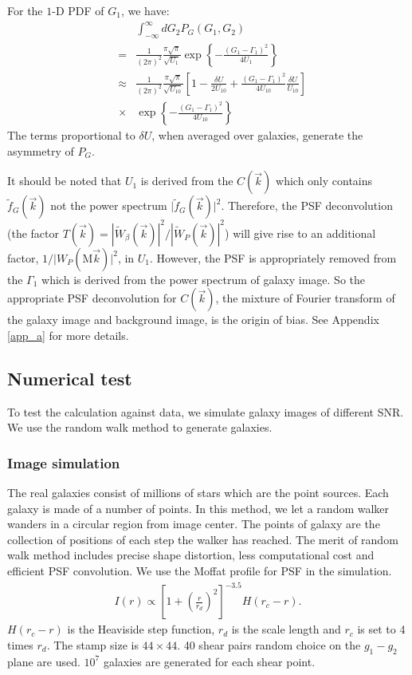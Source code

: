 \documentclass[twocolumn]{aastex62}
\begin{document}
For the $1$-D PDF of $G_1$, we have:
\begin{eqnarray}
\label{1d_PDF}
&&\int_{-\infty}^{\infty}dG_2 P_G\left(G_1,G_2\right)\\ \nonumber
&=&\frac{1}{(2\pi)^2}\frac{\pi\sqrt{\pi}}{\sqrt{U_1}}\exp\left\{-\frac{\left(G_1-\Gamma_1\right)^2}{4U_1}\right\}\\ \nonumber
&\approx&\frac{1}{(2\pi)^2}\frac{\pi\sqrt{\pi}}{\sqrt{U_{10}}}\left[1-\frac{\delta U}{2U_{10}}+\frac{\left(G_1-\Gamma_1\right)^2}{4U_{10}}\frac{\delta U}{U_{10}}\right] \\ \nonumber &\times&\exp\left\{-\frac{\left(G_1-\Gamma_1\right)^2}{4U_{10}}\right\}
\end{eqnarray}
The terms proportional to $\delta U$, when averaged over galaxies, generate the asymmetry of $P_G$. 

It should be noted that $U_1$ is derived from the $C(\vec{k})$ which only contains $\widetilde{f}_G(\vec{k})$ not the power spectrum $\vert\widetilde{f}_G(\vec{k})\vert^2$. Therefore, the PSF deconvolution (the factor $T(\vec{k}) = |\widetilde{W}_{\beta}(\vec{k})|^2/|\widetilde{W}_{P}(\vec{k})|^2$) will give rise to an additional factor, $1/\vert W_{P}(\mathrm{M}\vec{k})\vert^2$, in $U_1$. However, the PSF is appropriately removed from the $\Gamma_1$ which is derived from the power spectrum of galaxy image. So the appropriate PSF deconvolution for $C(\vec{k})$, the mixture of Fourier transform of the galaxy image and background image, is the origin of bias. See Appendix \ref{app_a} for more details.


\subsection{Numerical test}
To test the calculation against data, we simulate galaxy images of different SNR. We use the random walk method to generate galaxies.
\subsubsection{Image simulation}
The real galaxies consist of millions of stars which are the point sources. Each galaxy is made of a number of points. In this method, we let a random walker wanders in a circular region from image center. The points of galaxy are the collection of positions of each step the walker has reached. The merit of random walk method includes precise shape distortion, less computational cost and efficient PSF convolution. We use the Moffat profile for PSF in the simulation. 
\begin{eqnarray}
I(r) \propto \left[1+\left(\frac{r}{r_d}\right)^2\right]^{-3.5}H(r_c-r).
\end{eqnarray}
$H(r_c-r)$ is the Heaviside step function, $r_d$ is the scale length and $r_c$ is set to 4 times $r_d$. The stamp size is $44\times44$. 40 shear pairs random choice on the $g_1-g_2$ plane are used. $10^7$ galaxies are generated for each shear point.
\end{document}
